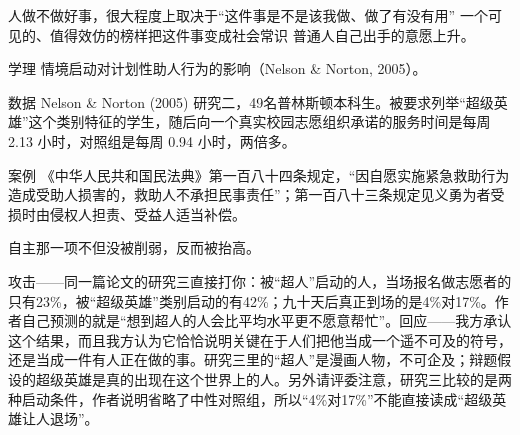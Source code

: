 \documentclass[prep,both]{debate}
\begin{document}
\begin{fields}
\begin{mechanism}[机制]
\step 人做不做好事，很大程度上取决于“这件事是不是该我做、做了有没有用”
\step 一个可见的、值得效仿的榜样把这件事变成社会常识
\step 普通人自己出手的意愿上升。

\end{mechanism}
\begin{evidence}{学理}
情境启动对计划性助人行为的影响（Nelson \& Norton, 2005）。
\end{evidence}
\begin{evidence}{数据}
Nelson \& Norton (2005) 研究二，49名普林斯顿本科生。被要求列举“超级英雄”这个类别特征的学生，随后向一个真实校园志愿组织承诺的服务时间是每周 2.13 小时，对照组是每周 0.94 小时，两倍多。
\end{evidence}
\begin{evidence}{案例}
《中华人民共和国民法典》第一百八十四条规定，“因自愿实施紧急救助行为造成受助人损害的，救助人不承担民事责任”；第一百八十三条规定见义勇为者受损时由侵权人担责、受益人适当补偿。
\end{evidence}
\closing[回扣判准]{自主那一项不但没被削弱，反而被抬高。}
\begin{clash}
攻击——同一篇论文的研究三直接打你：被“超人”启动的人，当场报名做志愿者的只有23\%，被“超级英雄”类别启动的有42\%；九十天后真正到场的是4\%对17\%。作者自己预测的就是“想到超人的人会比平均水平更不愿意帮忙”。回应——我方承认这个结果，而且我方认为它恰恰说明关键在于人们把他当成一个遥不可及的符号，还是当成一件有人正在做的事。研究三里的“超人”是漫画人物，不可企及；辩题假设的超级英雄是真的出现在这个世界上的人。另外请评委注意，研究三比较的是两种启动条件，作者说明省略了中性对照组，所以“4\%对17\%”不能直接读成“超级英雄让人退场”。
\end{clash}
\end{fields}
\end{document}
